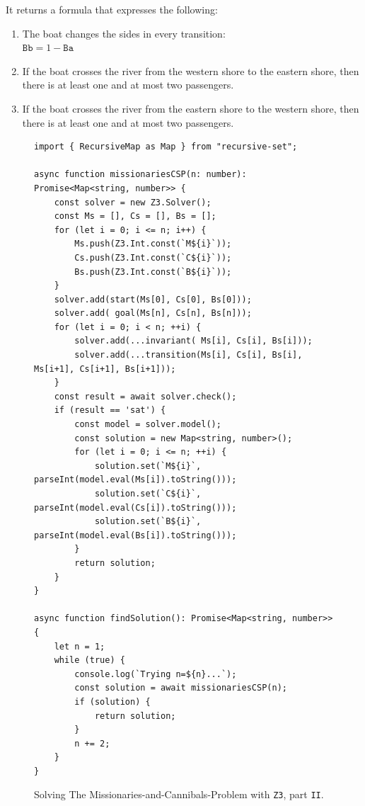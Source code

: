 \begin{enumerate}
      It returns a formula that expresses the following:
      \begin{enumerate}
      \item The boat changes the sides in every transition:
            \\[0.2cm]
            \hspace*{1.3cm}
            $\mathtt{Bb} = 1 - \mathtt{Ba}$
      \item If the boat crosses the river from the western shore to the eastern shore,
            then there is at least one and at most two passengers.
      \item If the boat crosses the river from the eastern shore to the western shore,
            then there is at least one and at most two passengers.
      \end{enumerate}
\end{enumerate}

\begin{figure}[!ht]
\centering
\begin{verbatim}
import { RecursiveMap as Map } from "recursive-set";

async function missionariesCSP(n: number): Promise<Map<string, number>> {
    const solver = new Z3.Solver();
    const Ms = [], Cs = [], Bs = [];
    for (let i = 0; i <= n; i++) {
        Ms.push(Z3.Int.const(`M${i}`));
        Cs.push(Z3.Int.const(`C${i}`));
        Bs.push(Z3.Int.const(`B${i}`));
    }
    solver.add(start(Ms[0], Cs[0], Bs[0]));
    solver.add( goal(Ms[n], Cs[n], Bs[n]));
    for (let i = 0; i < n; ++i) {
        solver.add(...invariant( Ms[i], Cs[i], Bs[i]));
        solver.add(...transition(Ms[i], Cs[i], Bs[i], Ms[i+1], Cs[i+1], Bs[i+1]));
    }
    const result = await solver.check();
    if (result == 'sat') {
        const model = solver.model();
        const solution = new Map<string, number>();
        for (let i = 0; i <= n; ++i) {
            solution.set(`M${i}`, parseInt(model.eval(Ms[i]).toString()));
            solution.set(`C${i}`, parseInt(model.eval(Cs[i]).toString()));
            solution.set(`B${i}`, parseInt(model.eval(Bs[i]).toString()));
        }
        return solution;
    } 
}

async function findSolution(): Promise<Map<string, number>> {
    let n = 1;
    while (true) {
        console.log(`Trying n=${n}...`);
        const solution = await missionariesCSP(n);
        if (solution) {
            return solution;
        }
        n += 2;
    }
}  
\end{verbatim}
\vspace*{-0.3cm}
\caption{Solving The Missionaries-and-Cannibals-Problem with \texttt{Z3}, part \texttt{II}.}
\label{fig:Missionaries-Z3.ipynb-2}
\end{figure} %

